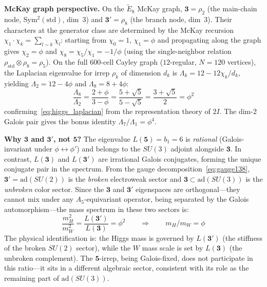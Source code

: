 \documentclass[12pt,a4paper]{article}
\theoremstyle{definition}
\begin{document}
\textbf{McKay graph perspective.}  On the $\widetilde{E}_8$ McKay graph, $\mathbf{3} = \rho_2$ (the main-chain node, Sym$^2(\text{std})$, dim~3) and $\mathbf{3'} = \rho_8$ (the branch node, dim~3).  Their characters at the generator class are determined by the McKay recursion $\chi_1 \cdot \chi_k = \sum_{l \sim k} \chi_l$: starting from $\chi_0 = 1$, $\chi_1 = \phi$ and propagating along the graph gives $\chi_2 = \phi$ and $\chi_8 = \chi_5/\chi_1 = -1/\phi$ (using the single-neighbor relation $\rho_{\mathrm{std}} \otimes \rho_8 = \rho_5$).  On the full 600-cell Cayley graph ($12$-regular, $N=120$ vertices), the Laplacian eigenvalue for irrep $\rho_k$ of dimension $d_k$ is $\Lambda_k = 12 - 12\chi_k/d_k$, yielding $\Lambda_2 = 12 - 4\phi$ and $\Lambda_8 = 8 + 4\phi$:
\begin{equation}
\frac{\Lambda_8}{\Lambda_2} = \frac{2+\phi}{3-\phi} = \frac{5+\sqrt{5}}{5-\sqrt{5}} = \frac{3+\sqrt{5}}{2} = \phi^2
\label{eq:higgs_mckay}
\end{equation}
confirming~\eqref{eq:higgs_laplacian} from the representation theory of $2I$.  The dim-2 Galois pair gives the bonus identity $\Lambda_7/\Lambda_1 = \phi^4$.

\textbf{Why $\mathbf{3}$ and $\mathbf{3'}$, not $\mathbf{5}$?}  The eigenvalue $L(\mathbf{5}) = b_1 = 6$ is \emph{rational} (Galois-invariant under $\phi \leftrightarrow \phi'$) and belongs to the $SU(3)$ adjoint alongside $\mathbf{3}$.  In contrast, $L(\mathbf{3})$ and $L(\mathbf{3'})$ are irrational Galois conjugates, forming the unique conjugate pair in the spectrum.  From the gauge decomposition~\eqref{eq:gauge138}, $\mathbf{3'} = \mathrm{ad}(SU(2))$ is the \emph{broken} electroweak sector and $\mathbf{3} \subset \mathrm{ad}(SU(3))$ is the \emph{unbroken} color sector.  Since the $\mathbf{3}$ and $\mathbf{3'}$ eigenspaces are orthogonal---they cannot mix under any $A_5$-equivariant operator, being separated by the Galois automorphism---the mass spectrum in these two sectors is:
\begin{equation}
\frac{m_H^2}{m_W^2} = \frac{L(\mathbf{3'})}{L(\mathbf{3})} = \phi^2 \qquad \Longrightarrow \qquad m_H/m_W = \phi
\end{equation}
The physical identification is: the Higgs mass is governed by $L(\mathbf{3'})$ (the stiffness of the broken $SU(2)$ sector), while the $W$ mass scale is set by $L(\mathbf{3})$ (the unbroken complement).  The $\mathbf{5}$-irrep, being Galois-fixed, does not participate in this ratio---it sits in a different algebraic sector, consistent with its role as the remaining part of $\mathrm{ad}(SU(3))$.
\end{document}
